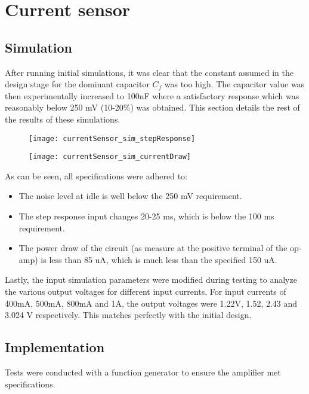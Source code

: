 \graphicspath{{content/chapter3/figures}}
\section{Current sensor}\label{sec:current_sensor_results}

\subsection{Simulation}

After running initial simulations, it was clear that the constant assumed in the design stage for the dominant capacitor $C_f$ was too high. The capacitor value was then experimentally
increased to 100nF where a satisfactory response which was reasonably below 250 mV (10-20\%) was obtained. This section details the rest of the results of these simulations.

\begin{figure}[h!]
   \centering
   \texttt{[image: currentSensor\_sim\_stepResponse]}
   \label{fig:simulation response}
\end{figure}

\begin{figure}[h!]
   \centering
   \texttt{[image: currentSensor\_sim\_currentDraw]}
   \label{fig:simulation_current}
\end{figure}

As can be seen, all specifications were adhered to:
\begin{itemize}
   \item The noise level at idle is well below the 250 mV requirement.
   \item The step response input changes 20-25 ms, which is below the 100 ms requirement.
   \item The power draw of the circuit (as measure at the positive terminal of the op-amp) is less than 85 uA, which is much less than the specified 150 uA.
\end{itemize}

Lastly, the input simulation parameters were modified during testing to analyze the various output voltages for different input currents. For input currents of 400mA, 500mA, 800mA and 1A,
the output voltages were 1.22V, 1.52, 2.43 and 3.024 V respectively. This matches perfectly with the initial design.

\subsection{Implementation}
Tests were conducted with a function generator to ensure the amplifier met specifications.

